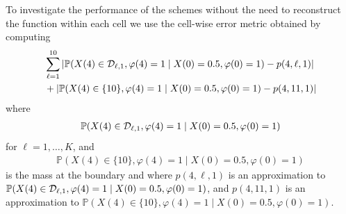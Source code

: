 To investigate the performance of the schemes without the need to reconstruct the function within each cell we use the cell-wise error metric obtained by computing 
\begin{align}
	&\sum_{\ell=1}^{10} \left|\mathbb P(X(4)\in\mathcal{D}_{\ell,1}, \varphi(4)=1\mid X(0)=0.5,\varphi(0)=1)-p(4,\ell,1)\right|\nonumber 
	\\&+\left|\mathbb P(X(4)\in\{10\}, \varphi(4)=1\mid X(0)=0.5,\varphi(0)=1)-p(4,11,1)\right| \label{eqn: cell errors}
\end{align}
where 
\begin{align}
	\mathbb P(X(4)\in\mathcal{D}_{\ell,1}, \varphi(4)=1\mid X(0)=0.5,\varphi(0)=1) \label{eqn: cell probs}
\end{align}
for \(\ell=1,\dots,K\), and 
\begin{align}
	\mathbb P(X(4)\in\{10\}, \varphi(4)=1\mid X(0)=0.5,\varphi(0)=1) \label{eqn: cell probs boundary}
\end{align}
is the mass at the boundary and where \(p(4,\ell,1)\) is an approximation to \(\mathbb P(X(4)\in\mathcal{D}_{\ell,1}, \varphi(4)=1\mid X(0)=0.5,\varphi(0)=1)\), and \(p(4,11,1)\) is an approximation to \(\mathbb P(X(4)\in\{10\}, \varphi(4)=1\mid X(0)=0.5,\varphi(0)=1)\).

